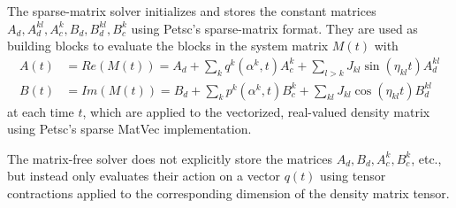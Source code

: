 \documentclass[11pt]{article}
\begin{document}
  
  The sparse-matrix solver initializes and stores the constant matrices
       $A_d, A_d^{kl}, A_c^k, B_d, B_d^{kl}, B_c^k$ using Petsc's sparse-matrix format. They are used
       as building blocks to evaluate the blocks in the system matrix $M(t)$ with 
     \begin{align}
       A(t) &= Re(M(t)) = A_d + \sum_k q^k(\alpha^k, t)A_c^k + \sum_{l>k} J_{kl} \sin(\eta_{kl}t) A_d^{kl}\\
       B(t) &= Im(M(t)) = B_d + \sum_k p^k(\alpha^k, t)B_c^k + \sum_{kl} J_{kl} \cos(\eta_{kl}t) B_d^{kl}
     \end{align}
   at each time $t$, which are applied to the vectorized, real-valued density matrix using Petsc's sparse MatVec implementation. 

  The matrix-free solver does not explicitly store the matrices $A_d,B_d,
       A_c^k, B_c^k$, etc., but instead only evaluates their action on a vector $q(t)$ using tensor contractions applied to the corresponding dimension of the density matrix tensor. 
\end{document}
